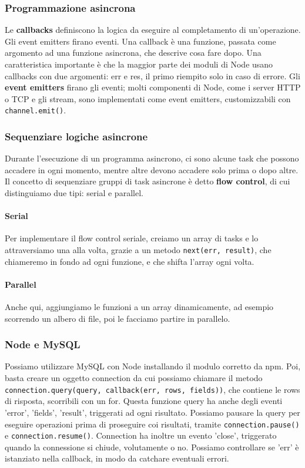 \documentclass[11pt]{article}
\newcommand{\code}[1]{\texttt{#1}}
\begin{document}
\subsubsection{Programmazione asincrona}
Le \textbf{callbacks} definiscono la logica da eseguire al completamento di un'operazione. Gli event emitters firano eventi. Una callback è una funzione, passata come argomento ad una funzione asincrona, che descrive cosa fare dopo. Una caratteristica importante è che la maggior parte dei moduli di Node usano callbacks con due argomenti: err e res, il primo riempito solo in caso di errore. Gli \textbf{event emitters} firano gli eventi; molti componenti di Node, come i server HTTP o TCP e gli stream, sono implementati come event emitters, customizzabili con \code{channel.emit()}. 
\subsubsection{Sequenziare logiche asincrone}
Durante l'esecuzione di un programma asincrono, ci sono alcune task che possono accadere in ogni momento, mentre altre devono accadere solo prima o dopo altre. Il concetto di sequenziare gruppi di task asincrone è detto \textbf{flow control}, di cui distinguiamo due tipi: serial e parallel. 
\paragraph{Serial} Per implementare il flow control seriale, creiamo un array di tasks e lo attraversiamo una alla volta, grazie a un metodo \code{next(err, result)}, che chiameremo in fondo ad ogni funzione, e che shifta l'array ogni volta.  
\paragraph{Parallel} Anche qui, aggiungiamo le funzioni a un array dinamicamente, ad esempio scorrendo un albero di file, poi le facciamo partire in parallelo.
\subsubsection{Node e MySQL}
Possiamo utilizzare MySQL con Node installando il modulo corretto da npm. Poi, basta creare un oggetto connection da cui possiamo chiamare il metodo \code{connection.query(query, callback(err, rows, fields))}, che contiene le rows di risposta, scorribili con un for. Questa funzione query ha anche degli eventi 'error', 'fields', 'result', triggerati ad ogni risultato. Possiamo pausare la query per eseguire operazioni prima di proseguire coi risultati, tramite \code{connection.pause()} e \code{connection.resume()}. Connection ha inoltre un evento 'close', triggerato quando la connessione si chiude, volutamente o no. Possiamo controllare se 'err' è istanziato nella callback, in modo da catchare eventuali errori.
\end{document}
